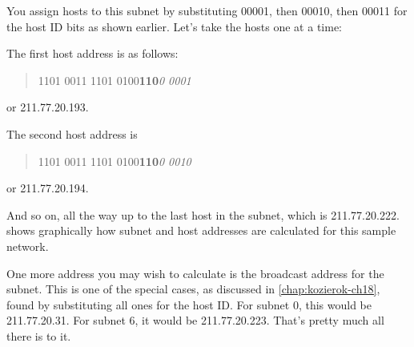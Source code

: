 You assign hosts to this subnet by substituting 00001, then 00010, then 00011 for the host ID bits as shown earlier.
Let's take the hosts one at a time:

The first host address is as follows:
\begin{quote}
1101 0011 1101 0100\quad \textbf{110}\textit{0 0001}
\end{quote}
or 211.77.20.193.

The second host address is
\begin{quote}
1101 0011 1101 0100\quad \textbf{110}\textit{0 0010}
\end{quote}
or 211.77.20.194.

And so on, all the way up to the last host in the subnet, which is 211.77.20.222.
 shows graphically how subnet and host addresses are calculated for this sample network.

One more address you may wish to calculate is the broadcast address for the subnet.
This is one of the special cases, as discussed in \cref{chap:kozierok-ch18}, found by substituting all ones for the host ID.
For subnet 0, this would be 211.77.20.31.
For subnet 6, it would be 211.77.20.223.
That's pretty much all there is to it.


